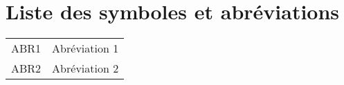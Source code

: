 \section*{Liste des symboles et abréviations}

\begin{flushleft}
   \begin{tabular}{@{}ll}
    ABR1            & Abréviation 1                                     \\
    ABR2            & Abréviation 2                                     \\
   \end{tabular}
\end{flushleft}

\clearpage